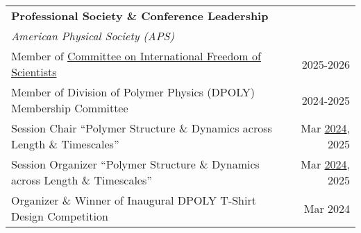 \documentclass[letterpaper,11pt]{article}
\begin{document}
\begin{longtable}{@{}p{}r@{}}
  \multicolumn{2}{l}{\hspace{-3mm} \bf{Professional Society \& Conference Leadership}} 			                                                                                                                                                                                        \\ [4pt]
  \multicolumn{2}{l}{\hspace{1mm} \textit{American Physical Society (APS)}}                                                                                                                                                                                                                     \\ [3pt]
  \hspace{7mm} Member of \href{https://www.aps.org/about/governance/committees/cifs}{Committee on International Freedom of Scientists}                                                                            & 2025-2026                                                                   \\ [3pt]
  \hspace{7mm} Member of Division of Polymer Physics (DPOLY) Membership Committee                                                                                                                                 & 2024-2025                                                                   \\ [3pt]
  \hspace{7mm} Session Chair ``Polymer Structure \& Dynamics across Length \& Timescales''                                                                                                               & Mar \href{https://meetings.aps.org/Meeting/MAR24/Session/Y32}{2024}, 2025   \\ [3pt]
  \hspace{7mm} Session Organizer ``Polymer Structure \& Dynamics across Length \& Timescales''                                                                                                           & Mar \href{https://meetings.aps.org/Meeting/MAR24/Session/Y32}{2024}, 2025   \\ [3pt]
  \hspace{7mm} Organizer \& Winner of Inaugural DPOLY T-Shirt Design Competition                                                                                                                                  & Mar 2024                                                                    \\ [3pt]

\end{longtable}
\end{document}

